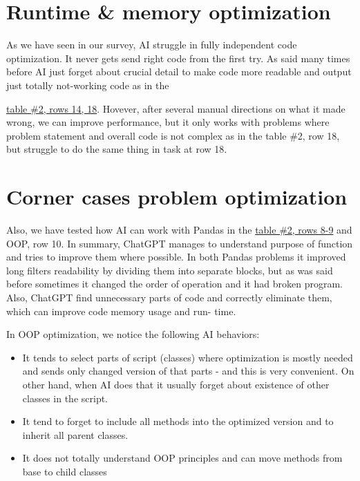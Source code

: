 \documentclass[12pt]{report}
\begin{document}
	\section{Runtime \& memory optimization}
		
		
		As we have seen in our survey, AI struggle in fully independent code optimization. It never gets send right code from the first try. As said many times
		before AI just forget about crucial detail to make code more readable and
		output just totally not-working code as in the 
		
		\href{https://docs.google.com/spreadsheets/d/1qXPyAJsOOpmtxIoGqObwG5mTaLU3IWO0SQRGbjZPhEc/edit#gid=0}{table \#2, rows 14, 18}. Hovever, after several manual directions on what it made wrong, we can improve
		performance, but it only works with problems where problem statement and
		overall code is not complex as in the table \#2, row 18, but struggle to do
		the same thing in task at row 18.
		
	
	\section{Corner cases problem optimization}
	
			Also, we have tested how AI can work with Pandas in the \href{https://docs.google.com/spreadsheets/d/1qXPyAJsOOpmtxIoGqObwG5mTaLU3IWO0SQRGbjZPhEc/edit#gid=0}{table \#2, rows 8-9} and OOP, row 10. In summary, ChatGPT manages to understand purpose of
			function and tries to improve them where possible. In both Pandas problems
			it improved long filters readability by dividing them into separate blocks, but
			as was said before sometimes it changed the order of operation and it had
			broken program. Also, ChatGPT find unnecessary parts of code and
			correctly eliminate them, which can improve code memory usage and run-
			time.
			
			In OOP optimization, we notice the following AI behaviors:
			
			\begin{itemize}
				\item It tends to select parts of script (classes) where optimization is mostly
				needed and sends only changed version of that parts - and this is very
				convenient. On other hand, when AI does that it usually forget about
				existence of other classes in the script.
				\item It tend to forget to include all methods into the optimized version and
				to inherit all parent classes.
				\item It does not totally understand OOP principles and can move methods
				from base to child classes
			\end{itemize}
			
\end{document}
